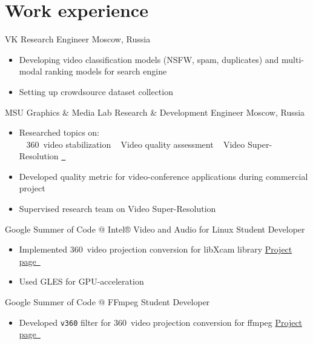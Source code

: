\documentclass{tccv}
\newcommand{\sphere}{360\textdegree~}
\begin{document}
\section{Work experience}

\begin{eventlist}

     {VK}
     {Research Engineer}
     {Moscow, Russia}
\begin{itemize}
     \item Developing video classification models (NSFW, spam, duplicates) and multi-modal ranking models for search engine
     \item Setting up crowdsource dataset collection
\end{itemize}

     {MSU Graphics \& Media Lab}
     {Research \& Development Engineer}
     {Moscow, Russia}
\begin{itemize}
     \item Researched topics on:\\
          \faAngleRight~ \sphere video stabilization\qquad
          \faAngleRight~ Video quality assessment\qquad
          \faAngleRight~ Video Super-Resolution \href{https://videoprocessing.ai/benchmarks/video-super-resolution.html}{~\faExternalLink*}
     \item Developed quality metric for video-conference applications during commercial project
     \item Supervised research team on Video Super-Resolution
\end{itemize}

     {Google Summer of Code @ Intel® Video and Audio for Linux}
     {Student Developer}
     {}
\begin{itemize}
     \item Implemented \sphere video projection conversion for libXcam library\hfill
     \href{https://unishift.github.io/project/2021-08-20-gsoc-libxcam}{Project page~\faExternalLink*}
     \item Used GLES for GPU-acceleration
\end{itemize}

     {Google Summer of Code @ FFmpeg}
     {Student Developer}
     {}
\begin{itemize}
     \item Developed \texttt{v360} filter for \sphere video projection conversion for ffmpeg\hfill
     \href{https://unishift.github.io/project/2019-08-26-gsoc-ffmpeg}{Project page~\faExternalLink*}
\end{itemize}

\end{eventlist}
\end{document}
